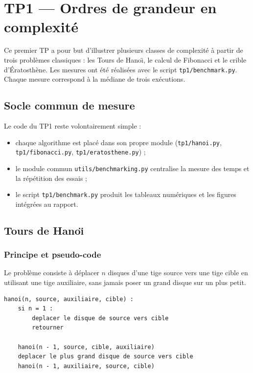 \section{TP1 --- Ordres de grandeur en complexit\'{e}}\label{sec:tp1}

Ce premier TP a pour but d'illustrer plusieurs classes de complexit\'{e} \`{a}
partir de trois probl\`{e}mes classiques : les Tours de Hano\"{\i}, le calcul de
Fibonacci et le crible d'\'{E}ratosth\`{e}ne.
Les mesures ont \'{e}t\'{e} r\'{e}alis\'{e}es
avec le script \texttt{tp1/benchmark.py}.
Chaque mesure correspond \`{a} la
m\'{e}diane de trois ex\'{e}cutions.

\subsection{Socle commun de mesure}\label{subsec:tp1-socle}

Le code du TP1 reste volontairement simple :

\begin{itemize}
	\item chaque algorithme est plac\'{e} dans son propre module
	      (\texttt{tp1/hanoi.py}, \texttt{tp1/fibonacci.py},
	      \texttt{tp1/eratosthene.py}) ;
	\item le module commun \texttt{utils/benchmarking.py} centralise la mesure
	      des temps et la r\'{e}p\'{e}tition des essais ;
	\item le script \texttt{tp1/benchmark.py} produit les tableaux num\'{e}riques
	      et les figures int\'{e}gr\'{e}es au rapport.
\end{itemize}

\subsection{Tours de Hano\"{\i}}\label{subsec:tp1-hanoi}

\subsubsection{Principe et pseudo-code}\label{subsubsec:tp1-hanoi-principe}

Le probl\`{e}me consiste \`{a} d\'{e}placer \(n\) disques d'une tige source vers une
tige cible en utilisant une tige auxiliaire, sans jamais poser un grand disque
sur un plus petit.

\begin{lstlisting}[basicstyle=\ttfamily,label={lst:tp1-hanoi-pseudocode}]
hanoi(n, source, auxiliaire, cible) :
    si n = 1 :
        deplacer le disque de source vers cible
        retourner

    hanoi(n - 1, source, cible, auxiliaire)
    deplacer le plus grand disque de source vers cible
    hanoi(n - 1, auxiliaire, source, cible)
\end{lstlisting}

